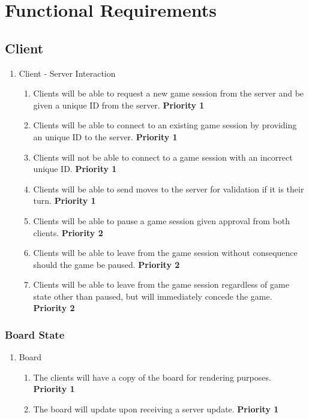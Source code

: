 \documentclass[10pt]{article}
\begin{document}
\section{Functional Requirements}

\subsection{Client}

\begin{enumerate}[label*=R\arabic*.]
    \item Client - Server Interaction
    \begin{enumerate}[label*=\arabic*.]
        \item Clients will be able to request a new game session from the server and be given a unique ID from the server. \textbf{Priority 1}
        \item Clients will be able to connect to an existing game session by providing an unique ID to the server. \textbf{Priority 1}
        \item Clients will not be able to connect to a game session with an incorrect unique ID. \textbf{Priority 1}
        \item Clients will be able to send moves to the server for validation if it is their turn. \textbf{Priority 1}
        \item Clients will be able to pause a game session given approval from both clients. \textbf{Priority 2}
        \item Clients will be able to leave from the game session without consequence should the game be paused. \textbf{Priority 2}
        \item Clients will be able to leave from the game session regardless of game state other than paused, but will immediately concede the game. \textbf{Priority 2}
    \end{enumerate}
\end{enumerate}

\subsubsection{Board State}

\begin{enumerate}[resume*]
    \item Board
    \begin{enumerate}[label*=\arabic*.]
        \item The clients will have a copy of the board for rendering purposes. \textbf{Priority 1}
        \item The board will update upon receiving a server update. \textbf{Priority 1}
    \end{enumerate}
\end{enumerate}
\end{document}
